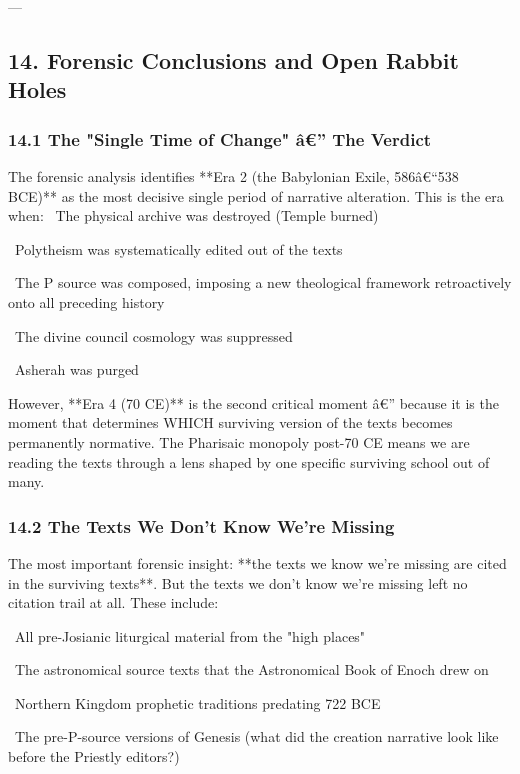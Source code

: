 \documentclass[aps,prd,11pt,onecolumn,superscriptaddress,nofootinbib,floatfix]{revtex4-2}
\begin{document}
---


\subsection{14. Forensic Conclusions and Open Rabbit Holes}


\subsubsection{14.1 The "Single Time of Change" â€'' The Verdict}


The forensic analysis identifies **Era 2 (the Babylonian Exile, 586â€``538 BCE)** as the most decisive single period of narrative alteration. This is the era when:
\textbullet~The physical archive was destroyed (Temple burned)

\textbullet~Polytheism was systematically edited out of the texts

\textbullet~The P source was composed, imposing a new theological framework retroactively onto all preceding history

\textbullet~The divine council cosmology was suppressed

\textbullet~Asherah was purged



However, **Era 4 (70 CE)** is the second critical moment â€'' because it is the moment that determines WHICH surviving version of the texts becomes permanently normative. The Pharisaic monopoly post-70 CE means we are reading the texts through a lens shaped by one specific surviving school out of many.


\subsubsection{14.2 The Texts We Don't Know We're Missing}


The most important forensic insight: **the texts we know we're missing are cited in the surviving texts**. But the texts we don't know we're missing left no citation trail at all. These include:


\textbullet~All pre-Josianic liturgical material from the "high places"

\textbullet~The astronomical source texts that the Astronomical Book of Enoch drew on

\textbullet~Northern Kingdom prophetic traditions predating 722 BCE

\textbullet~The pre-P-source versions of Genesis (what did the creation narrative look like before the Priestly editors?)
\end{document}
